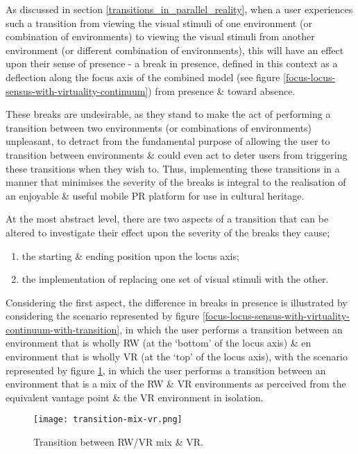 As discussed in section \ref{transitions_in_parallel_reality}, when a user experiences such a transition from viewing the visual stimuli of one environment (or combination of environments) to viewing the visual stimuli from another environment (or different combination of environments), this will have an effect upon their sense of presence - a break in presence, defined in this context as a deflection along the focus axis of the combined model (see figure \ref{focus-locus-sensus-with-virtuality-continuum}) from presence \& toward absence.

These breaks are undesirable, as they stand to make the act of performing a transition between two environments (or combinations of environments) unpleasant, to detract from the fundamental purpose of allowing the user to transition between environments \& could even act to deter users from triggering these transitions when they wish to. Thus, implementing these transitions in a manner that minimises the severity of the breaks is integral to the realisation of an enjoyable \& useful mobile PR platform for use in cultural heritage.

At the most abstract level, there are two aspects of a transition that can be altered to investigate their effect upon the severity of the breaks they cause;
\begin{enumerate}
	\item the starting \& ending position upon the locus axis;
	\item the implementation of replacing one set of visual stimuli with the other.
\end{enumerate}

Considering the first aspect, the difference in breaks in presence is illustrated by considering the scenario represented by figure \ref{focus-locus-sensus-with-virtuality-continuum-with-transition}, in which the user performs a transition between an environment that is wholly RW (at the `bottom' of the locus axis) \& en environment that is wholly VR (at the `top' of the locus axis), with the scenario represented by figure \ref{transition-mix-vr.png}, in which the user performs a transition between an environment that is a mix of the RW \& VR environments as perceived from the equivalent vantage point \& the VR environment in isolation.

\begin{figure}[h]
	\begin{center}
		\texttt{[image: transition-mix-vr.png]}
		\caption{Transition between RW/VR mix \& VR.}
		\label{transition-mix-vr.png}
	\end{center}
\end{figure}

